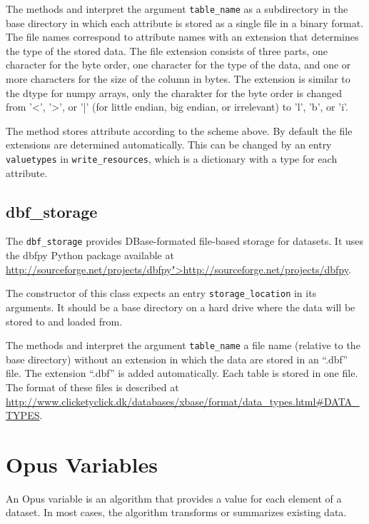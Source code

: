 {The methods  \datasetindex and 
interpret the argument \verb|table_name| as a subdirectory in the base directory in which each attribute is stored as a
single file in a binary format. The file names correspond to attribute names
with an extension that determines the type of the stored data. The file
extension consists of three parts, one character for the byte order, one
character for the type of the data, and one or more characters for the size of
the column in bytes. The extension is similar to the dtype for numpy arrays,
only the charakter for the byte order is changed from '<', '>', or '|' (for
little endian, big endian, or irrelevant) to 'l', 'b', or 'i'.

The method  stores attribute according to the scheme
above. By default the file extensions are determined automatically.  This can
be changed by an entry \verb|valuetypes| in \verb|write_resources|, which is a
dictionary with a type for each attribute.



\subsection{dbf_storage}
%
The \verb|dbf_storage| provides DBase-formated file-based storage for
datasets.  It uses the dbfpy Python package available at
\url{http://sourceforge.net/projects/dbfpy">http://sourceforge.net/projects/dbfpy}.

The constructor of this class expects an entry \verb|storage_location| in its
arguments. It should be a base directory on a hard drive where
the data will be stored to and loaded from.

The methods  and 
interpret the argument \verb|table_name| a file
name (relative to the base directory) without an extension in which the data are stored
in an ``.dbf'' file.  The extension ``.dbf'' is added automatically. Each table
is stored in one file. The format of these files is described at
\url{http://www.clicketyclick.dk/databases/xbase/format/data_types.html\#DATA_TYPES}.

\section{Opus Variables} 
\label{sec:opus-variable}
\variablesindex

An Opus variable \variablesindex is an algorithm that provides a value for
each element of a dataset. \datasetindex In most cases, the algorithm
transforms or summarizes existing data.

}
